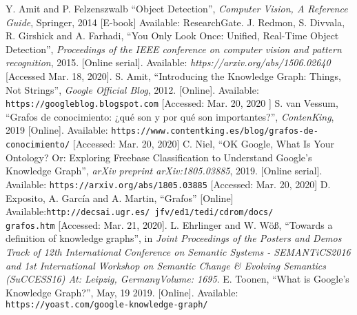 \begin{thebibliography}{00}
  Y. Amit and P. Felzenszwalb
  ``Object Detection'',
  \textit{Computer Vision, A Reference Guide}, Springer, 2014
  [E-book] Available: ResearchGate.
  J. Redmon, S. Divvala, R. Girshick and A. Farhadi,
  ``You Only Look Once: Unified, Real-Time Object Detection'',
  \textit{Proceedings of the IEEE conference on computer 
  vision and pattern recognition}, 2015. [Online serial]. Available: 
  \textit{https://arxiv.org/abs/1506.02640} [Accessed Mar. 18, 2020].
  S. Amit, ``Introducing the Knowledge Graph: Things, Not Strings'',
  \textit{Google Official Blog}, 2012. [Online]. Available: 
  \texttt{https://googleblog.blogspot.com} [Accessed: Mar. 20, 2020 ]
  S. van Vessum, ``Grafos de conocimiento: ¿qué son y por qué son
  importantes?'', \textit{ContenKing}, 2019 [Online]. Available:
  \texttt{https://www.contentking.es/blog/grafos-de- \\conocimiento/}
  [Accessed: Mar. 20, 2020]   
  C. Niel, ``OK Google, What Is Your Ontology? Or: Exploring Freebase
  Classification to Understand Google’s Knowledge Graph'',
  \textit{arXiv preprint arXiv:1805.03885}, 2019. [Online serial].
  Available: \texttt{https://arxiv.org/abs/1805.03885} [Accessed: Mar. 20, 2020]
  D. Exposito, A. García and A. Martin, ``Grafos'' [Online]
  Available:\texttt{http://decsai.ugr.es/~jfv/ed1/tedi/cdrom/docs/ 
  \\grafos.htm}
  [Accessed: Mar. 21, 2020].
  L. Ehrlinger and W. Wöß, ``Towards a definition of knowledge 
  graphs'', in \textit{Joint Proceedings of the Posters and Demos Track of 12th 
  International Conference on Semantic Systems - SEMANTiCS2016 and 1st 
  International Workshop on Semantic Change \& Evolving Semantics (SuCCESS16)
  At: Leipzig, GermanyVolume: 1695}.
  E. Toonen, ``What is Google’s Knowledge Graph?'', May, 19 2019. [Online].
  Available: \texttt{https://yoast.com/google-knowledge-graph/}  

\end{thebibliography}
